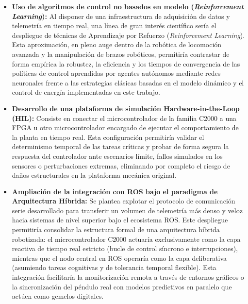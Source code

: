 \documentclass[11pt,fleqn]{book} %
\begin{document}
\begin{itemize}
	\item \textbf{Uso de algoritmos de control no basados en modelo (\textit{Reinforcement Learning}):} Al disponer de una infraestructura de adquisición de datos y telemetría en tiempo real, una línea de gran interés científico sería el despliegue de técnicas de Aprendizaje por Refuerzo (\textit{Reinforcement Learning}). Esta aproximación, en pleno auge dentro de la robótica de locomoción avanzada y la manipulación de brazos robóticos, permitiría contrastar de forma empírica la robustez, la eficiencia y los tiempos de convergencia de las políticas de control aprendidas por agentes autónomos mediante redes neuronales frente a las estrategias clásicas basadas en el modelo dinámico y el control de energía implementadas en este trabajo.
	
	\item \textbf{Desarrollo de una plataforma de simulación Hardware-in-the-Loop (HIL):} Consiste en conectar el microcontrolador de la familia C2000 a una FPGA u otro microcontrolador encargado de ejecutar el comportamiento de la planta en tiempo real. Esta configuración permitiría validar el determinismo temporal de las tareas críticas y probar de forma segura la respuesta del controlador ante escenarios límite, fallos simulados en los sensores o perturbaciones extremas, eliminando por completo el riesgo de daños estructurales en la plataforma mecánica original.
	
	\item \textbf{Ampliación de la integración con ROS bajo el paradigma de Arquitectura Híbrida:} Se plantea explotar el protocolo de comunicación serie desarrollado para transferir un volumen de telemetría más denso y veloz hacia sistemas de nivel superior bajo el ecosistema ROS. Este despliegue permitiría consolidar la estructura formal de una arquitectura híbrida robotizada: el microcontrolador C2000 actuaría exclusivamente como la capa reactiva de tiempo real estricto (bucle de control síncrono e interrupciones), mientras que el nodo central en ROS operaría como la capa deliberativa (asumiendo tareas cognitivas y de tolerancia temporal flexible). Esta integración facilitaría la monitorización remota a través de entornos gráficos o la sincronización del péndulo real con modelos predictivos en paralelo que actúen como gemelos digitales.
\end{itemize}



\end{document}
